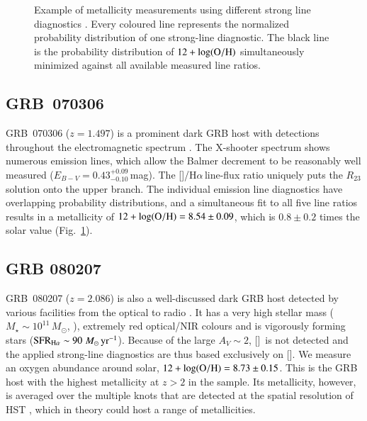 \documentclass[traditabstract, longauth]{aa}
\newcommand{\ha}{H$\alpha$}
\newcommand{\oh}{12+\log(\rm{O/H})}
\newcommand{\oii}{[\ion{O}{ii}]}
\newcommand{\nii}{[\ion{N}{ii}]}
\newcommand{\Msun}{$M_\odot$}
\newcommand{\Msunyr}{$M_\odot\,\rm{yr}^{-1}$}
\begin{document}
\begin{appendix}
\begin{figure}
\begin{subfigure}{.33\textwidth}
\end{subfigure}
\caption{Example of metallicity measurements using different strong line diagnostics \citep{2006A&A...459...85N, 2008A&A...488..463M}. Every coloured line represents the normalized probability distribution of one strong-line diagnostic. The black line is the probability distribution of $\oh$ simultaneously minimized against all available measured line ratios.}
\label{fig:zexamples}
\end{figure}

\subsection{GRB~070306} GRB~070306 ($z=1.497$) is a prominent dark GRB host with detections throughout the electromagnetic spectrum \citep{2014A&A...565A.112H, 2014arXiv1408.5076S, 2015ApJ...801..102P}. The X-shooter spectrum shows numerous emission lines, which allow the Balmer decrement to be reasonably well measured ($E_{B-V} = 0.43_{-0.10}^{+0.09}$\,mag). The \nii/\ha\,line-flux ratio uniquely puts the $R_{23}$ solution onto the upper branch. The individual emission line diagnostics have overlapping probability distributions, and a simultaneous fit to all five line ratios results in a metallicity of $\oh=8.54\pm0.09$, which is $0.8\pm0.2$ times the solar value (Fig.~\ref{fig:zexamples}).

\subsection{GRB 080207} GRB~080207 ($z=2.086$) is also a well-discussed dark GRB host detected by various facilities from the optical to radio \citep[e.g.,][]{2011ApJ...736L..36H, 2012MNRAS.421...25S, 2012A&A...545A..77R}. It has a very high stellar mass ($M_{\star}\sim10^{11}$\,\Msun, \citealt{2013ApJ...778..128P}), extremely red optical/NIR colours and is vigorously forming stars ($\rm{SFR}_{\rm{H\alpha}}\sim 90\,$\Msunyr). Because of the large $A_V\sim2$, \oii\, is not detected and the applied strong-line diagnostics are thus based exclusively on \nii. We measure an oxygen abundance around solar, $\oh = 8.73\pm0.15$. This is the GRB host with the highest metallicity at $z>2$ in the sample. Its metallicity, however, is averaged over the multiple knots that are detected at the spatial resolution of HST \citep{2012MNRAS.421...25S}, which in theory could host a range of metallicities. 


\end{appendix}
\end{document}
